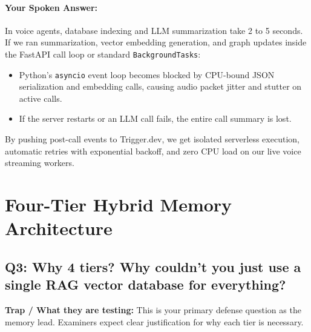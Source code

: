 \documentclass[11pt,a4paper]{article}
\begin{document}
\paragraph{Your Spoken Answer:}
In voice agents, database indexing and LLM summarization take 2 to 5 seconds. If we ran summarization, vector embedding generation, and graph updates inside the FastAPI call loop or standard \texttt{BackgroundTasks}:
\begin{itemize}
    \item Python's \texttt{asyncio} event loop becomes blocked by CPU-bound JSON serialization and embedding calls, causing audio packet jitter and stutter on active calls.
    \item If the server restarts or an LLM call fails, the entire call summary is lost.
\end{itemize}
By pushing post-call events to Trigger.dev, we get isolated serverless execution, automatic retries with exponential backoff, and zero CPU load on our live voice streaming workers.

\newpage

\section{Four-Tier Hybrid Memory Architecture}

\subsection*{Q3: Why 4 tiers? Why couldn't you just use a single RAG vector database for everything?}
\textbf{Trap / What they are testing:} This is your primary defense question as the memory lead. Examiners expect clear justification for why each tier is necessary.
\end{document}
